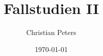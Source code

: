 \documentclass[a4paper,12pt]{article}
\title{Fallstudien II}
\author{Christian Peters}
\date{\today}
\begin{document}
\maketitle
\thispagestyle{empty}

\newpage
\tableofcontents
\thispagestyle{empty}

\newpage

\setcounter{page}{1}











\newpage

\nocite{XGBoost, IEEE}


\end{document}
